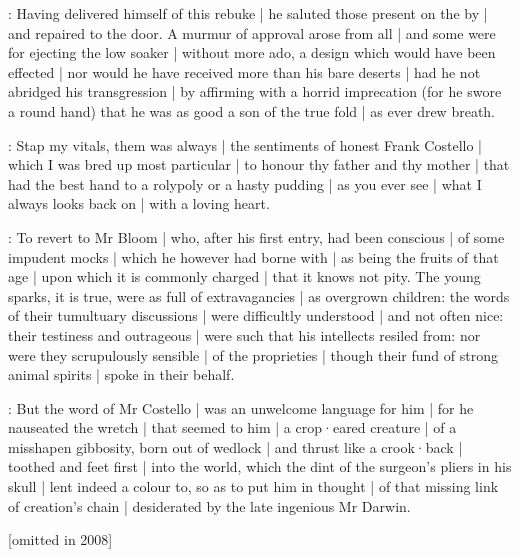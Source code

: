 :
Having delivered himself of this rebuke |
he saluted those present on the by |
and repaired to the door.
A murmur of approval arose from all |
and some were for ejecting the low soaker |
without more ado,
a design which would have been effected |
nor would he have received more than his bare deserts |
had he not abridged his transgression |
by affirming with a horrid imprecation
(for he swore a round hand)
that he was as good a son of the true fold |
as ever drew breath.

\punch:
Stap my vitals,
them was always |
the sentiments of honest Frank Costello |
which I was bred up most particular |
to honour thy father and thy mother |
that had the best hand to a rolypoly or a hasty pudding |
as you ever see |
what I always looks back on |
with a loving heart.



:
To revert to Mr Bloom |
who,
after his first entry,
had been conscious |
of some impudent mocks |
which he however had borne with |
as being the fruits of that age |
upon which it is commonly charged |
that it knows not pity.
The young sparks,
it is true,
were as full of extravagancies |
as overgrown children:
the words of their tumultuary discussions |
were difficultly understood |
and not often nice:
their testiness and outrageous  |
were such that his intellects resiled from:
nor were they scrupulously sensible |
of the proprieties |
though their fund of strong animal spirits |
spoke in their behalf.

:
But the word of Mr Costello |
was an unwelcome language for him |
for he nauseated the wretch |
that seemed to him |
a crop·eared creature |
of a misshapen gibbosity,
born out of wedlock |
and thrust like a crook·back |
toothed and feet first |
into the world,
which the dint of the surgeon's pliers in his skull |
lent indeed a colour to,
so as to put him in thought |
of that missing link of creation's chain |
desiderated by the late ingenious Mr Darwin.

[omitted in 2008]

